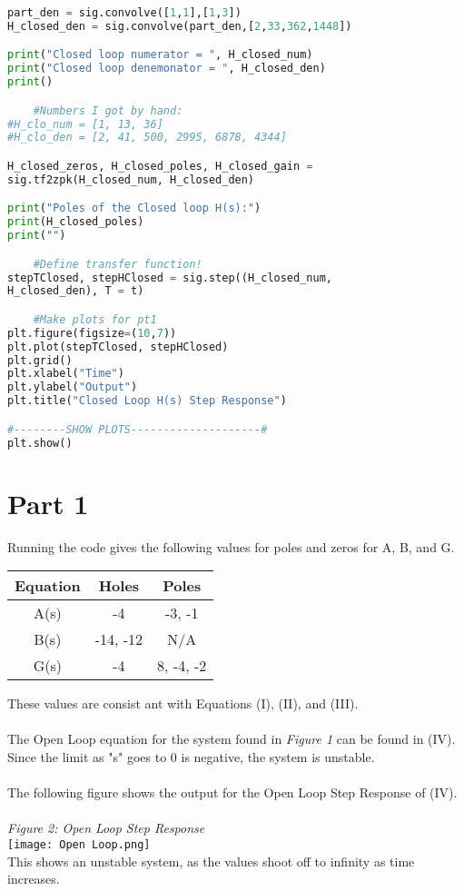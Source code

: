 \documentclass[12pt,a4paper]{article}
\begin{document}
\begin{lstlisting}[language=Python]
part_den = sig.convolve([1,1],[1,3])
H_closed_den = sig.convolve(part_den,[2,33,362,1448])

print("Closed loop numerator = ", H_closed_num)
print("Closed loop denemonator = ", H_closed_den)
print()

    #Numbers I got by hand:
#H_clo_num = [1, 13, 36]
#H_clo_den = [2, 41, 500, 2995, 6878, 4344]

H_closed_zeros, H_closed_poles, H_closed_gain = 
sig.tf2zpk(H_closed_num, H_closed_den)

print("Poles of the Closed loop H(s):")
print(H_closed_poles)
print("")

    #Define transfer function!
stepTClosed, stepHClosed = sig.step((H_closed_num, 
H_closed_den), T = t)

    #Make plots for pt1
plt.figure(figsize=(10,7))
plt.plot(stepTClosed, stepHClosed)
plt.grid()
plt.xlabel("Time")
plt.ylabel("Output")
plt.title("Closed Loop H(s) Step Response")

#--------SHOW PLOTS--------------------#
plt.show()
\end{lstlisting}
\newpage
\section{Part 1}
Running the code gives the following values for poles and zeros for A, B, and G.
\begin{center}
\begin{tabular}{ |c|c|c| } 
 \hline
 Equation & Holes & Poles \\ 
 \hline \hline
 A(s) & -4 & -3, -1 \\ 
 \hline
 B(s) & -14, -12 & N/A \\ 
 \hline
 G(s) & -4 & 8, -4, -2 \\ 
 \hline
\end{tabular}
\end{center}
These values are consist ant with Equations (I), (II), and (III). \\
\\
The Open Loop equation for the system found in \textit{Figure 1} can be found in (IV). Since the limit as "s" goes to 0 is negative, the system is unstable.\\
\\
The following figure shows the output for the Open Loop Step Response of (IV).\\
\\
\textit{Figure 2: Open Loop Step Response}
\\
\texttt{[image: Open Loop.png]}
\\
This shows an unstable system, as the values shoot off to infinity as time increases.
\newpage
\end{document}
